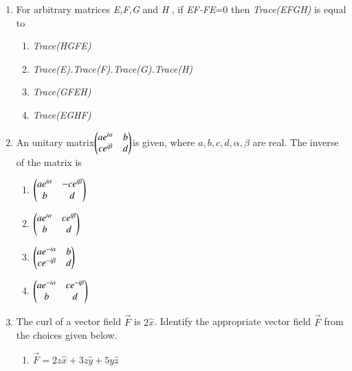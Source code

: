 \documentclass[journal,12pt,onecolumn]{IEEEtran}
\theoremstyle{remark}
\begin{document}
\begin{enumerate}
    \item For arbitrary matrices \textit{E,F,G} and \textit{H} , if \textit{EF-FE}=0 then \textit{Trace(EFGH)} is equal to
    \hfill{}
    \begin{multicols}{2}
    \begin{enumerate}
        \item \textit{Trace(HGFE)}
         \item \textit{Trace(E).Trace(F).Trace(G).Trace(H)}
        \item \textit{Trace(GFEH)}
        \item \textit{Trace(EGHF)}
    \end{enumerate}
    \end{multicols}
    \item An unitary matrix$\begin{pmatrix}
a e^{i\alpha} & b \\
c e^{i\beta} & d\end{pmatrix}
$is given, where \(a, b, c, d, \alpha, \beta\) are real. The inverse of the matrix is
\hfill{}
\begin{multicols}{2}
    \begin{enumerate}
    
\item
$\begin{pmatrix}
a e^{i\alpha} & -c e^{i\beta} \\
b & d\end{pmatrix}
$

\item 
$\begin{pmatrix}
a e^{i\alpha} & c e^{i\beta} \\
b & d
\end{pmatrix}$

\item
$\begin{pmatrix}
a e^{-i\alpha} & b \\
c e^{-i\beta} & d
\end{pmatrix}$

\item
$\begin{pmatrix}
a e^{-i\alpha} & c e^{-i\beta} \\
b & d\end{pmatrix}
$

 \end{enumerate}
    \end{multicols}
    \item The curl of a vector field $\overrightarrow{F}$ is $2\hat{x}$. Identify the appropriate vector field $\overrightarrow{F}$ from the choices given below.
    \hfill{}
\begin{multicols}{2}
    \begin{enumerate}
\item $\overrightarrow{F} = 2z\hat{x} + 3z\hat{y} + 5y\hat{z}$


\end{enumerate}
\end{multicols}
\end{enumerate}
\end{document}
